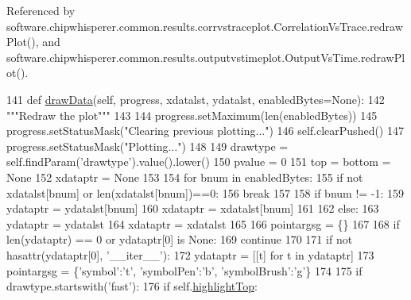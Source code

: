 Referenced by software.\+chipwhisperer.\+common.\+results.\+corrvstraceplot.\+Correlation\+Vs\+Trace.\+redraw\+Plot(), and software.\+chipwhisperer.\+common.\+results.\+outputvstimeplot.\+Output\+Vs\+Time.\+redraw\+Plot().


\begin{DoxyCode}
141     \textcolor{keyword}{def }\hyperlink{classsoftware_1_1chipwhisperer_1_1common_1_1results_1_1__plotdata_1_1AttackResultPlot_a2be54c916777ae6a9d39b05a9ae5302b}{drawData}(self, progress, xdatalst, ydatalst, enabledBytes=None):
142         \textcolor{stringliteral}{"""Redraw the plot"""}
143 
144         progress.setMaximum(len(enabledBytes))
145         progress.setStatusMask(\textcolor{stringliteral}{"Clearing previous plotting..."})
146         self.clearPushed()
147         progress.setStatusMask(\textcolor{stringliteral}{"Plotting..."})
148 
149         drawtype = self.findParam(\textcolor{stringliteral}{'drawtype'}).value().lower()
150         pvalue = 0
151         top = bottom = \textcolor{keywordtype}{None}
152         xdataptr = \textcolor{keywordtype}{None}
153 
154         \textcolor{keywordflow}{for} bnum \textcolor{keywordflow}{in} enabledBytes:
155             \textcolor{keywordflow}{if} \textcolor{keywordflow}{not} xdatalst[bnum] \textcolor{keywordflow}{or} len(xdatalst[bnum])==0:
156                 \textcolor{keywordflow}{break}
157 
158             \textcolor{keywordflow}{if} bnum != -1:
159                 ydataptr = ydatalst[bnum]
160                 xdataptr = xdatalst[bnum]
161 
162             \textcolor{keywordflow}{else}:
163                 ydataptr = ydatalst
164                 xdataptr = xdatalst
165 
166             pointargsg = \{\}
167 
168             \textcolor{keywordflow}{if} len(ydataptr) == 0 \textcolor{keywordflow}{or} ydataptr[0] \textcolor{keywordflow}{is} \textcolor{keywordtype}{None}:
169                 \textcolor{keywordflow}{continue}
170 
171             \textcolor{keywordflow}{if} \textcolor{keywordflow}{not} hasattr(ydataptr[0], \textcolor{stringliteral}{'\_\_iter\_\_'}):
172                 ydataptr = [[t] \textcolor{keywordflow}{for} t \textcolor{keywordflow}{in} ydataptr]
173                 pointargsg = \{\textcolor{stringliteral}{'symbol'}:\textcolor{stringliteral}{'t'}, \textcolor{stringliteral}{'symbolPen'}:\textcolor{stringliteral}{'b'}, \textcolor{stringliteral}{'symbolBrush'}:\textcolor{stringliteral}{'g'}\}
174 
175             \textcolor{keywordflow}{if} drawtype.startswith(\textcolor{stringliteral}{'fast'}):
176                 \textcolor{keywordflow}{if} self.\hyperlink{classsoftware_1_1chipwhisperer_1_1common_1_1results_1_1__plotdata_1_1AttackResultPlot_af92b8a374c600cd3e8c5cf55118dccff}{highlightTop}:

\end{DoxyCode}
